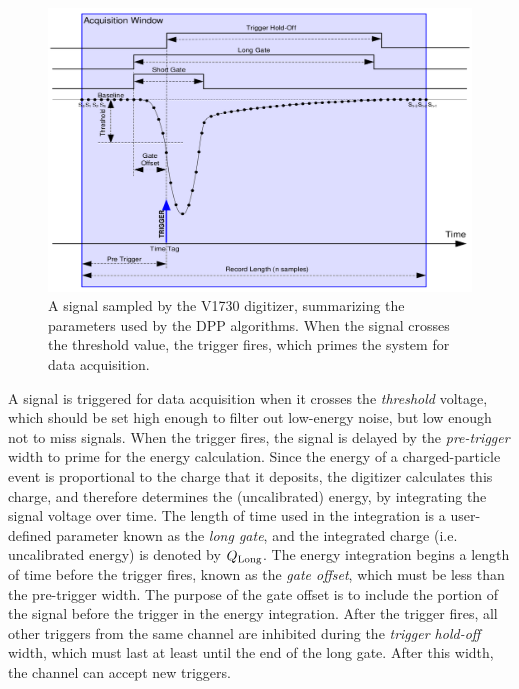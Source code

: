 \begin{figure}[t]
\centering
\includegraphics[width=6.5in]{Chapter-5/figs/trigger.png}
\caption{\label{fig:trigger}A signal sampled by the V1730 digitizer, summarizing the parameters used by the DPP algorithms. When the signal crosses the threshold value, the trigger fires, which primes the system for data acquisition.}
\end{figure}

A signal is triggered for data acquisition when it crosses the \emph{threshold} voltage, which should be set high enough to filter out low-energy noise, but low enough not to miss signals. When the trigger fires, the signal is delayed by the \emph{pre-trigger} width to prime for the energy calculation. Since the energy of a charged-particle event is proportional to the charge that it deposits, the digitizer calculates this charge, and therefore determines the (uncalibrated) energy, by integrating the signal voltage over time. The length of time used in the integration is a user-defined parameter known as the \emph{long gate}, and the integrated charge (i.e. uncalibrated energy) is denoted by $Q_{\textnormal{Long}}$. The energy integration begins a length of time before the trigger fires, known as the \emph{gate offset}, which must be less than the pre-trigger width. The purpose of the gate offset is to include the portion of the signal before the trigger in the energy integration. After the trigger fires, all other triggers from the same channel are inhibited during the \emph{trigger hold-off} width, which must last at least until the end of the long gate. After this width, the channel can accept new triggers. 


